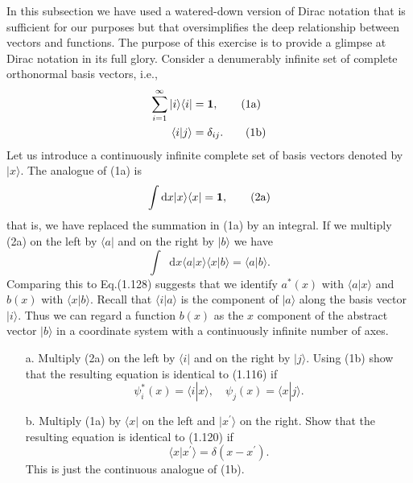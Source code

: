 \documentclass[a4paper]{book}
\newcounter{exercise}[chapter]
\newcommand*{\dif}{\mathop{}\!\mathrm{d}}
\newcommand{\I}{{\bf 1}}
\begin{document}
	\begin{exercise}
	In this subsection we have used a watered-down version of Dirac notation that is sufficient for our purposes but that oversimplifies the deep relationship between vectors and functions. The purpose of this exercise is to provide a glimpse at Dirac notation in its full glory. Consider a denumerably infinite set of complete orthonormal basis vectors, i.e.,
	\begin{align}
		\sum_{i=1}^\infty | i \rangle \langle i | &= \I, \tag{1a} \\
		\langle i | j \rangle &= \delta_{ij}. \tag{1b}
	\end{align}		
	Let us introduce a continuously infinite complete set of basis vectors denoted by $|x\rangle$. The analogue of (1a) is
	\begin{equation*}
		\int \dif x | x \rangle \langle x | = \I, \tag{2a}
	\end{equation*}
	that is, we have replaced the summation in (1a) by an integral. If we multiply (2a) on the left by $\langle a |$ and on the right by $| b \rangle$ we have
	\begin{equation*}
		\int \dif x \langle a | x \rangle \langle x | b \rangle = \langle a | b \rangle.
	\end{equation*}
	Comparing this to Eq.(1.128) suggests that we identify $a^*(x)$ with $\langle a | x \rangle$ and $b(x)$ with $\langle x | b \rangle$. Recall that $\langle i | a \rangle$ is the component of $| a \rangle$ along the basis vector $| i \rangle$. Thus we can regard a function $b(x)$ as the $x$ component of the abstract vector $| b \rangle$ in a coordinate system with a continuously infinite number of axes.
	\begin{enumerate}
	
	\item[a.] Multiply (2a) on the left by $\langle i |$ and on the right by $| j \rangle$. Using (1b) show that the resulting equation is identical to (1.116) if
	\begin{equation*}
		\psi^*_i(x) = \langle i | x \rangle, \quad \psi_j(x) = \langle x | j \rangle.
	\end{equation*}
	
	\item[b.] Multiply (1a) by $\langle x |$ on the left and $| x^\prime \rangle$ on the right. Show that the resulting equation is identical to (1.120) if
	\begin{equation*}
		\langle x | x^\prime \rangle = \delta( x - x^\prime ). \tag{2b}
	\end{equation*}
	This is just the continuous analogue of (1b).
	

\end{enumerate}
\end{exercise}
\end{document}
